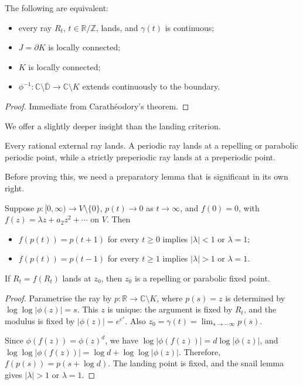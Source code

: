 \documentclass[11pt,a4paper]{article}
\begin{document}
\setcounter{theorem}{34}\begin{theorem}\label{cd8:landing}
The following are equivalent:
\begin{itemize}
\item every ray $R_t$, $t\in\mathbb R/\mathbb Z$, lands, and $\gamma(t)$ is continuous;
\item $J=\partial K$ is locally connected;
\item $K$ is locally connected;
\item $\phi^{-1}\colon\mathbb C\setminus\overline{\mathbb D}\to\mathbb C\setminus K$ extends continuously to the boundary.
\end{itemize}
\end{theorem}
\begin{proof}
Immediate from Carath\'eodory's theorem.
\end{proof}
We offer a slightly deeper insight than the landing criterion.
\setcounter{theorem}{35}\begin{theorem}\label{cd8:rational-rays}
Every rational external ray lands. A periodic ray lands at a repelling or parabolic periodic point, while a strictly preperiodic ray lands at a preperiodic point.
\end{theorem}
Before proving this, we need a preparatory lemma that is significant in its own right.
\setcounter{theorem}{36}\begin{lemma}
Suppose $p\colon[0,\infty)\to V\setminus\{0\}$, $p(t)\to0$ as $t\to\infty$, and $f(0)=0$, with $f(z)=\lambda z+a_2z^2+\cdots$ on $V$. Then
\begin{itemize}
\item $f(p(t))=p(t+1)$ for every $t\ge0$ implies $|\lambda|<1$ or $\lambda=1$;
\item $f(p(t))=p(t-1)$ for every $t\ge1$ implies $|\lambda|>1$ or $\lambda=1$.
\end{itemize}
\end{lemma}
\setcounter{theorem}{37}\begin{lemma}\label{cd8:preparatory}
If $R_t=f(R_t)$ lands at $z_0$, then $z_0$ is a repelling or parabolic fixed point.
\end{lemma}
\begin{proof}
Parametrise the ray by $p\colon\mathbb R\to\mathbb C\setminus K$, where $p(s)=z$ is determined by $\log\log|\phi(z)|=s$. This $z$ is unique: the argument is fixed by $R_t$, and the modulus is fixed by $|\phi(z)|=e^{e^s}$. Also $z_0=\gamma(t)=\lim_{s\to-\infty}p(s)$.

Since $\phi(f(z))=\phi(z)^d$, we have $\log|\phi(f(z))|=d\log|\phi(z)|$, and $\log\log|\phi(f(z))|=\log d+\log\log|\phi(z)|$. Therefore, $f(p(s))=p(s+\log d)$. The landing point is fixed, and the snail lemma gives $|\lambda|>1$ or $\lambda=1$.
\end{proof}
\end{document}
